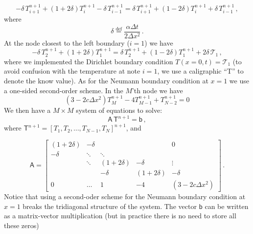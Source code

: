 \documentclass[11pt]{article}
\newcommand{\defn}{\stackrel{\text{def}}{=}}
\newcommand{\com}{\, ,}
\newcommand{\per}{\, .}
\def\beq{\begin{equation}}
\def\eeq{\end{equation}}
\begin{document}
\begin{enumerate}[label=(\alph*)]
        \beq
            \label{disc_ith}
            -\delta\,T_{i+1}^{n+1} + \left(1+2\delta\right)T_i^{n+1} -\delta\,T_{i-1}^{n+1} =   \delta\,T_{i+1}^{n+1} + \left(1-2\delta\right)T_i^{n+1} +\delta\,T_{i-1}^{n+1}\com
        \eeq
        where
        \beq
            \label{delta_defn}
            \delta \defn \frac{\alpha\Delta t}{2\Delta x^2}\per
        \eeq
        At the node closest to the left boundary ($i=1$) we have
        \beq
            \label{disc_left_boundary}
            -\delta\,T_{2}^{n+1} + \left(1+2\delta\right)T_1^{n+1} =   \delta\,T_{2}^{n+1} + \left(1-2\delta\right)T_1^{n+1} + 2\delta\,\mathcal{T}_1\com
        \eeq   
        where we implemented the Dirichlet boundary condition $T\left(x=0,t\right) = \mathcal{T}_1$ (to avoid confusion with the temperature at note $i=1$, we use a caligraphic ``T'' to denote the know value). As for the Neumann boundary condition at $x=1$ we use a one-sided second-order scheme. In the $M$'th node we have
        \beq
            \label{bc_rhs}
            (3-2 c\Delta x^2)T^{n+1}_M - 4T^{n+1}_{M-1}+T^{n+1}_{N-2} = 0
        \eeq
    We then have a $M \times M$ system of equations to solve:
    \beq
    \mathsf{A}\, \mathsf{T}^{n+1} = \mathsf{b}\com
    \eeq
    where $\mathsf{T}^{n+1} = \left[T_1,T_2,\ldots,T_{N-1},T_N\right]^{n+1}$, and


\begin{equation} \label{matrixM}
    \mathsf{A} = \left[ \begin{matrix}
            (1+2\delta) & -\delta & && 0\\
            -\delta & \ddots & \ddots & &\\
                    & \ddots & (1+2\delta) & -\delta &\vdots\\
                    && -\delta & (1+2\delta) & -\delta \\
    0 &\ldots &1& -4 & (3-2 c\Delta x^2)\end{matrix} \right]\per
\end{equation}
Notice that using a second-oder scheme for the Neumann boundary condition at $x=1$ breaks the tridiagonal structure of the system. The vector $\mathsf{b}$ can be written as a matrix-vector multiplication (but in practice there is no need to store all these zeros)


\end{enumerate}
\end{document}
